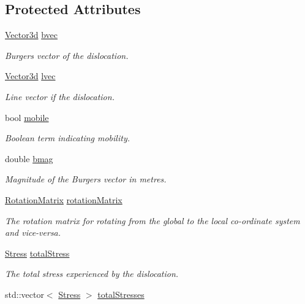 \subsection*{\-Protected \-Attributes}
\begin{DoxyCompactItemize}
\item 
\hyperlink{classVector3d}{\-Vector3d} \hyperlink{classDislocation_aad45c2eaade195f374707afb648ed17e}{bvec}
\begin{DoxyCompactList}\small\item\em \-Burgers vector of the dislocation. \end{DoxyCompactList}\item 
\hyperlink{classVector3d}{\-Vector3d} \hyperlink{classDislocation_a69d16092777d9ead2d4eedf7c3d47877}{lvec}
\begin{DoxyCompactList}\small\item\em \-Line vector if the dislocation. \end{DoxyCompactList}\item 
bool \hyperlink{classDislocation_a62c80daa260a3301baf1dceaab5d23d0}{mobile}
\begin{DoxyCompactList}\small\item\em \-Boolean term indicating mobility. \end{DoxyCompactList}\item 
double \hyperlink{classDislocation_a2b0284639af7fdfdf44fa0ef7fc1632e}{bmag}
\begin{DoxyCompactList}\small\item\em \-Magnitude of the \-Burgers vector in metres. \end{DoxyCompactList}\item 
\hyperlink{classRotationMatrix}{\-Rotation\-Matrix} \hyperlink{classDislocation_a5699d2984949af836396c8b7e5f21a5e}{rotation\-Matrix}
\begin{DoxyCompactList}\small\item\em \-The rotation matrix for rotating from the global to the local co-\/ordinate system and vice-\/versa. \end{DoxyCompactList}\item 
\hyperlink{classStress}{\-Stress} \hyperlink{classDislocation_ae27176c0d47fec3e188d7caa4c52f366}{total\-Stress}
\begin{DoxyCompactList}\small\item\em \-The total stress experienced by the dislocation. \end{DoxyCompactList}\item 
std\-::vector$<$ \hyperlink{classStress}{\-Stress} $>$ \hyperlink{classDislocation_adb36ed6c1772f2614ffbed4dcc748c13}{total\-Stresses}

\end{DoxyCompactItemize}
